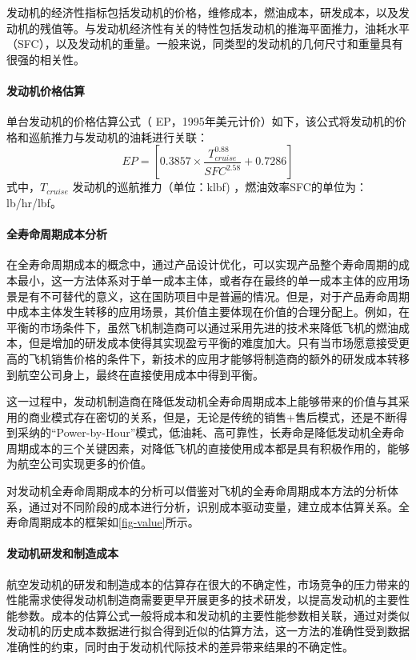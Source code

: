\documentclass[12pt,a4paper]{report}
\begin{document}
发动机的经济性指标包括发动机的价格，维修成本，燃油成本，研发成本，以及发动机的残值等。与发动机经济性有关的特性包括发动机的推海平面推力，油耗水平（SFC），以及发动机的重量。一般来说，同类型的发动机的几何尺寸和重量具有很强的相关性。

\paragraph{发动机价格估算}
单台发动机的价格估算公式（ EP，1995年美元计价）如下，该公式将发动机的价格和巡航推力与发动机的油耗进行关联：
\begin{equation}
EP=[0.3857\times \frac{T_{cruise}^{0.88}}{SFC^{2.58}}+0.7286] 
\end{equation}
式中，$T_{cruise}$ 发动机的巡航推力（单位：klbf) ，燃油效率SFC的单位为： lb/hr/lbf。

\paragraph{全寿命周期成本分析}
在全寿命周期成本的概念中，通过产品设计优化，可以实现产品整个寿命周期的成本最小，这一方法体系对于单一成本主体，或者存在最终的单一成本主体的应用场景是有不可替代的意义，这在国防项目中是普遍的情况。但是，对于产品寿命周期中成本主体发生转移的应用场景，其价值主要体现在价值的合理分配上。例如，在平衡的市场条件下，虽然飞机制造商可以通过采用先进的技术来降低飞机的燃油成本，但是增加的研发成本使得其实现盈亏平衡的难度加大。只有当市场愿意接受更高的飞机销售价格的条件下，新技术的应用才能够将制造商的额外的研发成本转移到航空公司身上，最终在直接使用成本中得到平衡。

这一过程中，发动机制造商在降低发动机全寿命周期成本上能够带来的价值与其采用的商业模式存在密切的关系，但是，无论是传统的销售+售后模式，还是不断得到采纳的“Power-by-Hour”模式，低油耗、高可靠性，长寿命是降低发动机全寿命周期成本的三个关键因素，对降低飞机的直接使用成本都是具有积极作用的，能够为航空公司实现更多的价值。

对发动机全寿命周期成本的分析可以借鉴对飞机的全寿命周期成本方法的分析体系，通过对不同阶段的成本进行分析，识别成本驱动变量，建立成本估算关系。全寿命周期成本的框架如\ref{fig-value}所示。

\paragraph{发动机研发和制造成本}
航空发动机的研发和制造成本的估算存在很大的不确定性，市场竞争的压力带来的性能需求使得发动机制造商需要更早开展更多的技术研发，以提高发动机的主要性能参数。成本的估算公式一般将成本和发动机的主要性能参数相关联，通过对类似发动机的历史成本数据进行拟合得到近似的估算方法，这一方法的准确性受到数据准确性的约束，同时由于发动机代际技术的差异带来结果的不确定性。
\end{document}
